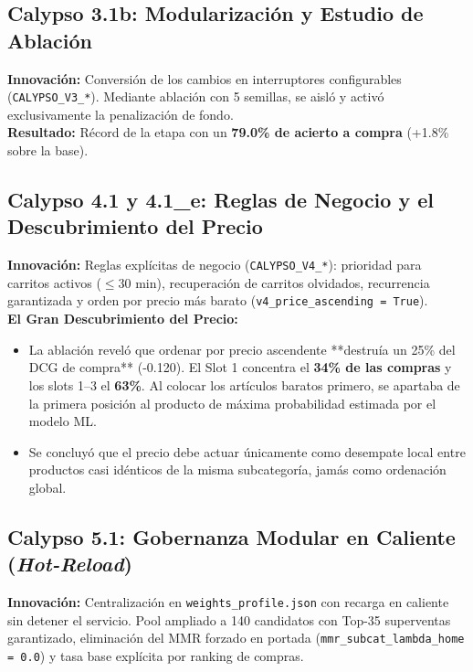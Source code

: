 \documentclass[11pt,a4paper]{article}
\begin{document}
\subsection{Calypso 3.1b: Modularización y Estudio de Ablación}
\textbf{Innovación:} Conversión de los cambios en interruptores configurables (\texttt{CALYPSO\_V3\_*}). Mediante ablación con 5 semillas, se aisló y activó exclusivamente la penalización de fondo.\\
\textbf{Resultado:} Récord de la etapa con un \textbf{79.0\% de acierto a compra} (+1.8\% sobre la base).

\subsection{Calypso 4.1 y 4.1\_e: Reglas de Negocio y el Descubrimiento del Precio}
\textbf{Innovación:} Reglas explícitas de negocio (\texttt{CALYPSO\_V4\_*}): prioridad para carritos activos ($\le 30$ min), recuperación de carritos olvidados, recurrencia garantizada y orden por precio más barato (\texttt{v4\_price\_ascending = True}).\\
\textbf{El Gran Descubrimiento del Precio:}
\begin{itemize}[noitemsep]
    \item La ablación reveló que ordenar por precio ascendente **destruía un 25\% del DCG de compra** (-0.120). El Slot 1 concentra el \textbf{34\% de las compras} y los slots 1--3 el \textbf{63\%}. Al colocar los artículos baratos primero, se apartaba de la primera posición al producto de máxima probabilidad estimada por el modelo ML.
    \item Se concluyó que el precio debe actuar únicamente como desempate local entre productos casi idénticos de la misma subcategoría, jamás como ordenación global.
\end{itemize}

\subsection{Calypso 5.1: Gobernanza Modular en Caliente (\textit{Hot-Reload})}
\textbf{Innovación:} Centralización en \texttt{weights\_profile.json} con recarga en caliente sin detener el servicio. Pool ampliado a 140 candidatos con Top-35 superventas garantizado, eliminación del MMR forzado en portada (\texttt{mmr\_subcat\_lambda\_home = 0.0}) y tasa base explícita por ranking de compras.
\end{document}
